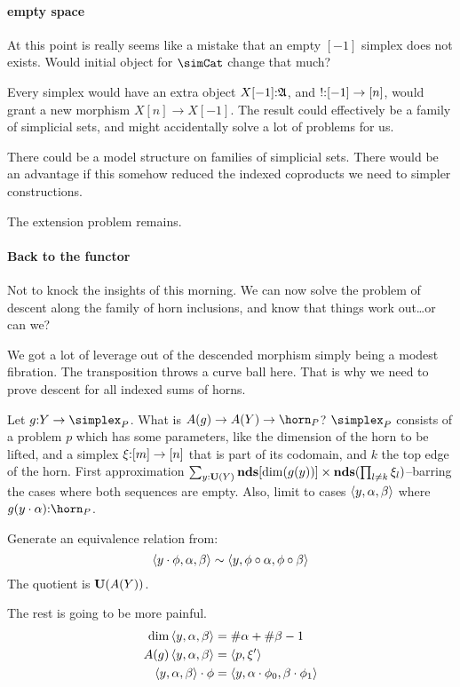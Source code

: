 \documentclass[csh.tex]{subfiles}
\begin{document}
\paragraph{empty space}
At this point is really seems like a mistake that an empty $[-1]$ simplex does not exists. Would initial object for $\simCat$ change that much?

Every simplex would have an extra object $X[-1]\mathord :\mathfrak A$, and $!\mathord : [-1] \to [n]$, would grant a new morphism $X[n]\to X[-1]$. The result could effectively be a family of simplicial sets, and might accidentally solve a lot of problems for us.

There could be a model structure on families of simplicial sets.
There would be an advantage if this somehow reduced the indexed coproducts we need to simpler constructions.

The extension problem remains.


\paragraph{Back to the functor}
Not to knock the insights of this morning. We can now solve the problem of descent along the family of horn inclusions, and know that things work out\dots or can we?

We got a lot of leverage out of the descended morphism simply being a modest fibration. The transposition throws a curve ball here. That is why we need to prove descent for all indexed sums of horns.

%
Let $g\of Y\to \simplex_P$. What is $A(g)\to A(Y)\to \horn_P$?
$\simplex_P$ consists of a problem $p$ which has some parameters, like the dimension of the horn to be lifted, and a simplex $\xi\mathord :[m]\to [n]$ that is part of its codomain, and $k$ the top edge of the horn. 
First approximation $\sum_{y\mathord :\mathbf{U}(Y)} \mathbf{nds}[\dim(g(y))]\times\mathbf{nds}(\prod_{l\neq k} \xi_l)$--barring the cases where both sequences are empty. Also, limit to cases $\left\langle y,\alpha,\beta \right\rangle$ where $g(y\cdot\alpha)\of\horn_P$.

Generate an equivalence relation from:
\[\left\langle y\cdot\phi,\alpha,\beta \right\rangle\sim \left\langle y,\phi\circ \alpha,\phi\circ \beta \right\rangle\]
The quotient is $\mathbf{U}(A(Y))$.

The rest is going to be more painful. 
\begin{align*}
\dim\left\langle y,\alpha,\beta \right\rangle &= \#\alpha+\#\beta-1\\
A(g)\left\langle y,\alpha,\beta \right\rangle &= \left\langle p,\xi' \right\rangle\\
\left\langle y,\alpha,\beta \right\rangle\cdot\phi &= \left\langle y,\alpha\cdot\phi_0,\beta\cdot\phi_1 \right\rangle
\end{align*}
\end{document}
